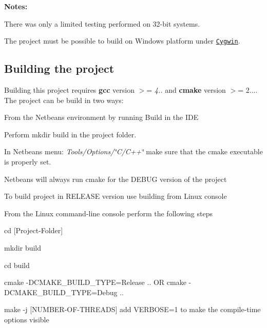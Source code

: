 {\bfseries Notes\+:}


\begin{DoxyEnumerate}
\item There was only a limited testing performed on 32-\/bit systems.
\item The project must be possible to build on Windows platform under \href{https://www.cygwin.com/}{\tt Cygwin}.
\end{DoxyEnumerate}

\subsection*{Building the project}

Building this project requires {\bfseries gcc} version $>$= {\itshape 4..} and {\bfseries cmake} version $>$= 2.... The project can be build in two ways\+:


\begin{DoxyItemize}
\item From the Netbeans environment by running Build in the I\+D\+E
\begin{DoxyItemize}
\item Perform {\ttfamily mkdir build} in the project folder.
\item In Netbeans menu\+: {\itshape Tools/\+Options/\char`\"{}\+C/\+C++\char`\"{}} make sure that the cmake executable is properly set.
\item Netbeans will always run cmake for the D\+E\+B\+U\+G version of the project
\item To build project in R\+E\+L\+E\+A\+S\+E version use building from Linux console
\end{DoxyItemize}
\item From the Linux command-\/line console perform the following steps
\begin{DoxyItemize}
\item {\ttfamily cd \mbox{[}Project-\/\+Folder\mbox{]}}
\item {\ttfamily mkdir build}
\item {\ttfamily cd build}
\item {\ttfamily cmake -\/\+D\+C\+M\+A\+K\+E\+\_\+\+B\+U\+I\+L\+D\+\_\+\+T\+Y\+P\+E=Release ..} O\+R {\ttfamily cmake -\/\+D\+C\+M\+A\+K\+E\+\_\+\+B\+U\+I\+L\+D\+\_\+\+T\+Y\+P\+E=Debug ..}
\item {\ttfamily make -\/j \mbox{[}N\+U\+M\+B\+E\+R-\/\+O\+F-\/\+T\+H\+R\+E\+A\+D\+S\mbox{]}} add {\ttfamily V\+E\+R\+B\+O\+S\+E=1} to make the compile-\/time options visible
\end{DoxyItemize}
\end{DoxyItemize}


